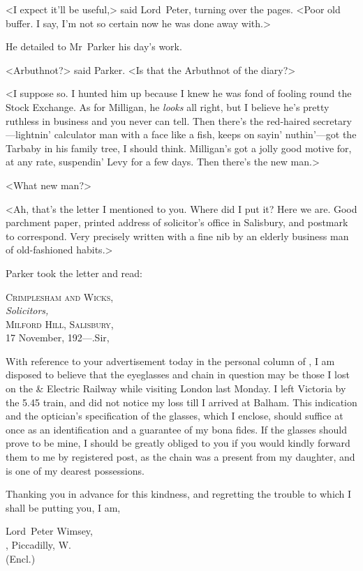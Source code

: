 <I expect it'll be useful,> said Lord~Peter, turning over the pages. <Poor old buffer. I say, I'm not so certain now he was done away with.>

He detailed to Mr~Parker his day's work.

<Arbuthnot?> said Parker. <Is that the Arbuthnot of the diary?>

<I suppose so. I hunted him up because I knew he was fond of fooling round the Stock Exchange. As for Milligan, he \emph{looks} all right, but I believe he's pretty ruthless in business and you never can tell. Then there's the red-haired secretary—lightnin' calculator man with a face like a fish, keeps on sayin' nuthin'—got the Tarbaby in his family tree, I should think. Milligan's got a jolly good motive for, at any rate, suspendin' Levy for a few days. Then there's the new man.>

<What new man?>

<Ah, that's the letter I mentioned to you. Where did I put it? Here we are. Good parchment paper, printed address of solicitor's office in Salisbury, and postmark to correspond. Very precisely written with a fine nib by an elderly business man of old-fashioned habits.>

Parker took the letter and read:

\begin{a4}
	\clearpage
\end{a4}


\begin{mail}{\textsc{Crimplesham and Wicks,}\\
\vin \textit{Solicitors,}\\
\textsc{Milford Hill, Salisbury,}\\
17 November, 192—.}{Sir,}

With reference to your advertisement today in the personal column of , I am disposed to believe that the eyeglasses and chain in question may be those I lost on the  \&  Electric Railway while visiting London last Monday. I left Victoria by the 5.45 train, and did not notice my loss till I arrived at Balham. This indication and the optician's specification of the glasses, which I enclose, should suffice at once as an identification and a guarantee of my bona fides. If the glasses should prove to be mine, I should be greatly obliged to you if you would kindly forward them to me by registered post, as the chain was a present from my daughter, and is one of my dearest possessions.

Thanking you in advance for this kindness, and regretting the trouble to which I shall be putting you, I am,


\noindent Lord~Peter Wimsey,\\
, Piccadilly, W\@.\\
\noindent (Encl.)
\end{mail}

